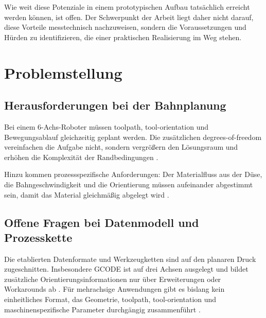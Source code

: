             Wie weit diese Potenziale in einem prototypischen Aufbau tatsächlich erreicht werden können, ist offen.
            Der Schwerpunkt der Arbeit liegt daher nicht darauf, diese Vorteile messtechnisch nachzuweisen, sondern die Voraussetzungen und Hürden zu identifizieren, die einer praktischen Realisierung im Weg stehen.

    \section{Problemstellung}\label{sec:problem-statement-and-research-gap}
        \subsection{Herausforderungen bei der Bahnplanung}\label{subsec:technical-challenges-path-planning}
            Bei einem 6-Achs-Roboter müssen \gls{toolpath}, \gls{tool-orientation} und Bewegungsablauf gleichzeitig geplant werden.
            Die zusätzlichen \gls{degrees-of-freedom} vereinfachen die Aufgabe nicht, sondern vergrößern den Lösungsraum und erhöhen die Komplexität der Randbedingungen \autocite[vgl.][S.~3776--3787]{lettoriReviewGeometryRepresentation2022}.

            Hinzu kommen prozessspezifische Anforderungen: Der Materialfluss aus der Düse, die Bahngeschwindigkeit und die Orientierung müssen aufeinander abgestimmt sein, damit das Material gleichmäßig abgelegt wird \autocite[vgl.][S.~3--7]{pelzerAdditiveManufacturingNonplanar2021}.

        \subsection{Offene Fragen bei Datenmodell und Prozesskette}\label{subsec:open-questions-data-model-and-process-chain}
            Die etablierten Datenformate und Werkzeugketten sind auf den planaren Druck zugeschnitten.
            Insbesondere \ac{GCODE} ist auf drei Achsen ausgelegt und bildet zusätzliche Orientierungsinformationen nur über Erweiterungen oder Workarounds ab \autocite[vgl.][S.~2554--2560]{latifReviewCodeSTEP2021}.
            Für mehrachsige Anwendungen gibt es bislang kein einheitliches Format, das Geometrie, \gls{toolpath}, \gls{tool-orientation} und maschinenspezifische Parameter durchgängig zusammenführt \autocite[vgl.][S.~3--6]{witteRealisierungFunktionalDeterminierten2024}.


